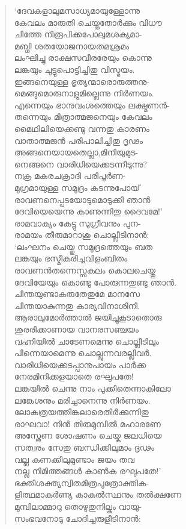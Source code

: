 \begin{verse}
‘ദേവകളാലുമസാധ്യമായുള്ളോന്നു\\
കേവലം മാരുതി ചെയ്തതോര്‍ക്കും വിധൗ\\
ചിത്തേ നിരൂപിക്കപോലുമശക്യമാ-\\
മബ്ധി ശതയോജനായതമശ്രമം\\
ലംഘിച്ചു രാക്ഷസവീരരേയും കൊന്നു\\
ലങ്കയും ചുട്ടുപൊട്ടിച്ചിതു വിസ്മയം.\\
ഇങ്ങനെയുള്ള ഭൃത്യന്മാരൊരുത്തനു-\\
മെങ്ങുമൊരുനാളുമില്ലെന്നു നിര്‍ണയം.\\
എന്നെയും ഭാനുവംശത്തെയും ലക്ഷ്മണന്‍-\\
തന്നെയും മിത്രാത്മജനെയും കേവലം\\
മൈഥിലിയെക്കണ്ടു വന്നതു കാരണം\\
വാതാത്മജന്‍ പരിപാലിച്ചിതു ദൃഢം\\
അങ്ങനെയായതെല്ലാ,മിനിയുമുട-\\
നെങ്ങനെ വാരിധിയെക്കടന്നീടുന്നു?\\
നക്ര മകരചക്രാദി പരിപൂര്‍ണ-\\
മുഗ്രമായുള്ള സമുദ്രം കടന്നുപോയ്\\
രാവണനെപ്പടയോടുമൊടുക്കി ഞാന്‍\\
ദേവിയെയെന്നു കാണുന്നിതു ദൈവമേ!’\\
രാമവാക്യം കേട്ടു സുഗ്രീവനും പുന-\\
രാമയം തീരുമാറാശു ചൊല്ലീടിനാന്‍:\\
‘ലംഘനം ചെയ്തു സമുദ്രത്തെയും ബത\\
ലങ്കയും ഭസ്മീകരിച്ചവിളംബിതം\\
രാവണന്‍തന്നെസ്സകുലം കൊലചെയ്തു\\
ദേവിയേയും കൊണ്ടു പോരുന്നതുണ്ടു ഞാന്‍.\\
ചിന്തയുണ്ടാകരുതേതുമേ മാനസേ\\
ചിന്തയാകുന്നതു കാര്യവിനാശിനി.\\
ആരാലുമോര്‍ത്താല്‍ ജയിച്ചുകൂടാതൊരു\\
ശുരരിക്കാണായ വാനരസഞ്ചയം \\
വഹ്നിയില്‍ ചാടേണമെന്നു ചൊല്ലീടിലും\\
പിന്നെയാമെന്നു ചൊല്ലുന്നവരല്ലിവര്‍.\\
വാരിധിയെക്കടപ്പാനുപായം പാര്‍ക്ക\\
നേരമിനിക്കളയാതെ രഘുപതേ!\\
ലങ്കയില്‍ ചെന്നു നാം പുക്കിതെന്നാകിലോ\\
ലങ്കേശനും മരിച്ചാനെന്നു നിര്‍ണയം.\\
ലോകത്രയത്തിങ്കലാരെതിര്‍ക്കുന്നിതു\\
രാഘവാ! നിന്‍ തിരുമുമ്പില്‍ മഹാരണേ\\
അസ്ത്രേണ ശോഷണം ചെയ്ക ജലധിയെ\\
സത്വരം സേതു ബന്ധിക്കിലുമാം ദൃഢം\\
വല്ല കണക്കിലുമുണ്ടാം ജയം തവ\\
നല്ല നിമിത്തങ്ങള്‍ കാണ്‍ക രഘുപതേ!’\\
ഭക്തിശക്ത്യന്വിതമിത്രപുത്രോക്തിക-\\
ളിത്ഥമാകര്‍ണ്യ കാകുല്‍സ്ഥനും തല്‍ക്ഷണേ\\
മുമ്പിലാമ്മാറു തൊഴുതുനില്കും വായു-\\
സംഭവനോടു ചോദിച്ചരുളീടിനാന്‍:
\end{verse}

